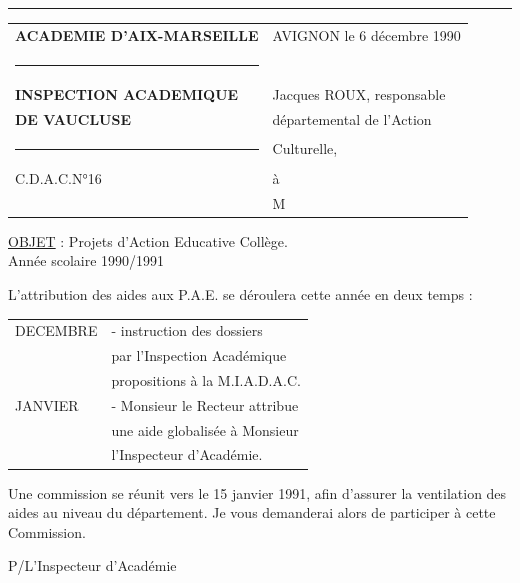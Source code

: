 \hrule
\begin{tabular}{p{.47\linewidth}p{.47\linewidth}}
\textbf{ACADEMIE D'AIX-MARSEILLE} & AVIGNON le 6 décembre 1990\\
\rule{3cm}{.4pt}&\\
\textbf{INSPECTION ACADEMIQUE} & Jacques ROUX, responsable\\
\textbf{DE VAUCLUSE}&départemental de l'Action\\
\rule{1cm}{.4pt}&Culturelle,\\[1em]
C.D.A.C.N°16&à\\[1em]
&M
\end{tabular}

\uline{OBJET} : Projets d'Action Educative Collège.\\
Année scolaire 1990/1991

L'attribution des aides aux P.A.E. se déroulera cette année en deux temps :

\begin{tabular}{l p{.72\linewidth}}
DECEMBRE & - instruction des dossiers\\
&par l'Inspection Académique\\[1em]
&propositions à la M.I.A.D.A.C.\\[1em]
JANVIER & - Monsieur le Recteur attribue\\
&une aide globalisée à Monsieur\\
&l'Inspecteur d'Académie.
\end{tabular}

Une commission se réunit vers le 15 janvier 1991, afin d'assurer la ventilation des aides au niveau du département. Je vous demanderai alors de participer à cette Commission.

P/L'Inspecteur d'Académie




